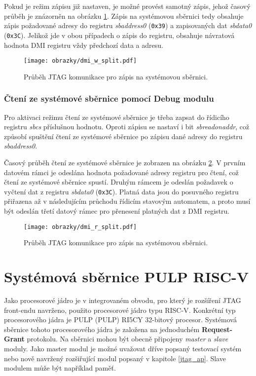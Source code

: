 Pokud je režim zápisu již nastaven, je možné provést samotný zápis, jehož časový průběh je znázorněn na obrázku \ref{fig:dmi_w}. Zápis na systémovou sběrnici tedy obsahuje zápis požadované adresy do registru \textit{sbaddress0} (\texttt{0x39}) a zapisovaných dat \textit{sbdata0} (\texttt{0x3C}). Jelikož jde v obou případech o zápis do registru, obsahuje návratová hodnota \acs{DMI} registru vždy předchozí data a adresu.
 
\begin{figure}[!h]
  \begin{center}
    \texttt{[image: obrazky/dmi\_w\_split.pdf]}
  \end{center}
  \caption{Průběh \acs{JTAG} komunikace pro zápis na systémovou sběrnici.}
	\label{fig:dmi_w}
\end{figure}

\subsubsection{Čtení ze systémové sběrnice pomocí Debug modulu}
Pro aktivaci režimu čtení ze systémové sběrnice je třeba zapsat do řídicího registru \textit{sbcs} příslušnou hodnotu. Oproti zápisu se nastaví i bit \textit{sbreadonaddr}, což způsobí spuštění čtení ze systémové sběrnice po zápisu dané adresy do registru \textit{sbaddress0}.

Časový průběh čtení ze systémové sběrnice je zobrazen na obrázku \ref{fig:dmi_r}. V prvním datovém rámci je odeslána hodnota požadované adresy registru pro čtení, což čtení ze systémové sběrnice spustí. Druhým rámcem je odeslán požadavek o vyčtení dat z registru \textit{sbdata0} (\texttt{0x3C}). Platná data jsou do posuvného registru přiřazena až v následujícím průchodu řídicím stavovým automatem, a proto musí být odeslán třetí datový rámec pro přenesení platných dat z \acs{DMI} registru.

\begin{figure}[!h]
  \begin{center}
    \texttt{[image: obrazky/dmi\_r\_split.pdf]}
  \end{center}
  \caption{Průběh \acs{JTAG} komunikace pro zápis na systémovou sběrnici.}
	\label{fig:dmi_r}
\end{figure}

\section{Systémová sběrnice PULP RISC-V}
Jako procesorové jádro je v integrovaném obvodu, pro který je rozšíření JTAG front-endu navrženo, použito procesorové jádro typu \acs{RISC-V}. Konkrétní typ procesorového jádra je \acs{PULP} (\acl{PULP}) RI5CY 32-bitový procesor. Systémová sběrnice tohoto procesorového jádra je založena na jednoduchém \textbf{Request-Grant} protokolu. Na sběrnici mohou být obecně připojeny \textit{master} a \textit{slave} moduly. Jako master modul je možné uvažovat dříve popsaný testovací systém nebo nově navržený rozšiřující modul popsaný v kapitole \ref{jtag_ap}. Slave modulem může být například paměť.

